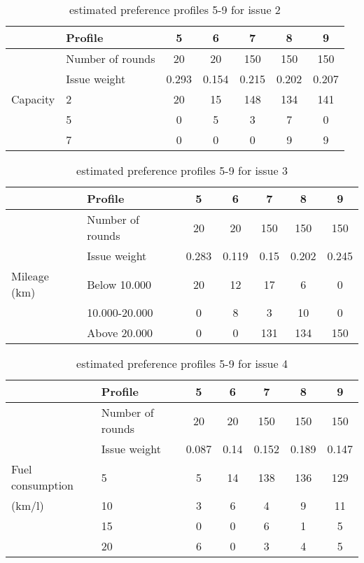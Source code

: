 \begin{table}[H]
\centering
\caption{estimated preference profiles 5-9 for issue 2}
\label{tab:issue2estimation}
\begin{tabular}{|p{3cm}|p{3cm}||c|c||c|c|c|}
\hline
&Profile & 5 & 6 & 7 & 8 & 9 \\
\hline
&Number of rounds & 20 & 20 & 150 & 150 & 150 \\
\hline
&Issue weight& 0.293 & 0.154 & 0.215 & 0.202 & 0.207 \\
\hline
\hline
Capacity 
&2 & 20 & 15 & 148 & 134 & 141 \\
&5 & 0  & 5  & 3   & 7   & 0 \\
&7 & 0  & 0  & 0   & 9   & 9 \\
\hline
\end{tabular}
\end{table}



\begin{table}[H]
\centering
\caption{estimated preference profiles 5-9 for issue 3}
\label{tab:issue3estimation}
\begin{tabular}{|p{3cm}|p{3cm}||c|c||c|c|c|}
\hline
&Profile & 5 & 6 & 7 & 8 & 9 \\
\hline
&Number of rounds & 20 & 20 & 150 & 150 & 150 \\
\hline
&Issue weight& 0.283 & 0.119 & 0.15 & 0.202 & 0.245 \\
\hline
\hline
Mileage (km)
&Below 10.000    & 20 & 12 & 17  & 6   & 0 \\
&10.000-20.000   & 0  & 8  & 3   & 10  & 0 \\
&Above 20.000    & 0  & 0  & 131 & 134 & 150 \\
\hline
\end{tabular}
\end{table}



\begin{table}[H]
\centering
\caption{estimated preference profiles 5-9 for issue 4}
\label{tab:issue4estimation}
\begin{tabular}{|p{3cm}|p{3cm}||c|c||c|c|c|}
\hline
&Profile & 5 & 6 & 7 & 8 & 9 \\
\hline
&Number of rounds & 20 & 20 & 150 & 150 & 150 \\
\hline
&Issue weight& 0.087 & 0.14 & 0.152 & 0.189 & 0.147 \\
\hline
\hline
Fuel consumption &5   & 5 & 14 & 138 & 136 & 129 \\
(km/l)           &10  & 3 & 6  & 4   & 9   & 11 \\
                 &15  & 0 & 0  & 6   & 1   & 5 \\
                 &20  & 6 & 0  & 3   & 4   & 5 \\
\hline
\end{tabular}
\end{table}



